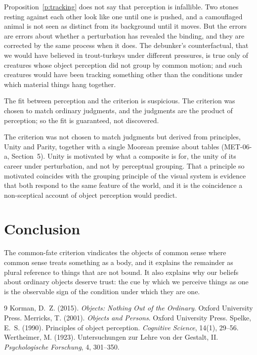 \documentclass{situationist-preprint}
\begin{document}
Proposition~\ref{p:tracking} does not say that perception is infallible. Two stones resting against each other look like one until one is pushed, and a camouflaged animal is not seen as distinct from its background until it moves. But the errors are errors about whether a perturbation has revealed the binding, and they are corrected by the same process when it does. The debunker's counterfactual, that we would have believed in trout-turkeys under different pressures, is true only of creatures whose object perception did not group by common motion; and such creatures would have been tracking something other than the conditions under which material things hang together.

\begin{objection}
The fit between perception and the criterion is suspicious. The criterion was chosen to match ordinary judgments, and the judgments are the product of perception; so the fit is guaranteed, not discovered.
\end{objection}

\begin{reply}
The criterion was not chosen to match judgments but derived from principles, Unity and Parity, together with a single Moorean premise about tables (MET-06-a, Section~5). Unity is motivated by what a composite is for, the unity of its career under perturbation, and not by perceptual grouping. That a principle so motivated coincides with the grouping principle of the visual system is evidence that both respond to the same feature of the world, and it is the coincidence a non-sceptical account of object perception would predict.
\end{reply}

\section{Conclusion}

The common-fate criterion vindicates the objects of common sense where common sense treats something as a body, and it explains the remainder as plural reference to things that are not bound. It also explains why our beliefs about ordinary objects deserve trust: the cue by which we perceive things as one is the observable sign of the condition under which they are one.

\begin{thebibliography}{9}\small
{} Korman, D.~Z. (2015). \emph{Objects: Nothing Out of the Ordinary}. Oxford University Press.
 Merricks, T. (2001). \emph{Objects and Persons}. Oxford University Press.
 Spelke, E.~S. (1990). Principles of object perception. \emph{Cognitive Science}, 14(1), 29--56.
 Wertheimer, M. (1923). Untersuchungen zur Lehre von der Gestalt, II. \emph{Psychologische Forschung}, 4, 301--350.
\end{thebibliography}
\end{document}
